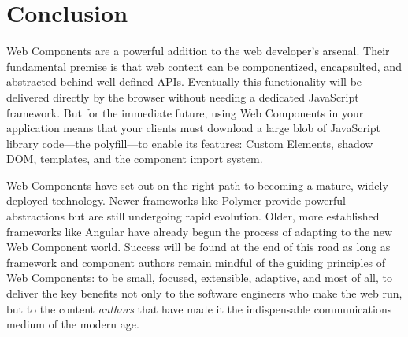 \chapter{Conclusion}
%

Web Components are a powerful addition to the web developer's arsenal. 
Their fundamental premise is that web content can be componentized, encapsulted, and abstracted behind well-defined APIs.
Eventually this functionality will be delivered directly by the browser without needing a dedicated JavaScript framework.
But for the immediate future, using Web Components in your application means that your clients must download a large blob of JavaScript library code---the polyfill---to enable its features: 
Custom Elements, 
shadow DOM, 
templates, and 
the component import system.

Web Components have set out on the right path to becoming a mature, widely deployed technology. 
Newer frameworks like Polymer provide powerful abstractions but are still undergoing rapid evolution.
Older, more established frameworks like Angular have already begun the process of adapting to the new Web Component world. 
Success will be found at the end of this road as long as framework and component authors remain mindful of the guiding principles of Web Components: 
to be small, focused, extensible, adaptive, 
and most of all, 
to deliver the key benefits 
not only to the software engineers who make the web run,
but to the content \textit{authors} that have made it the indispensable communications medium of the modern age.
